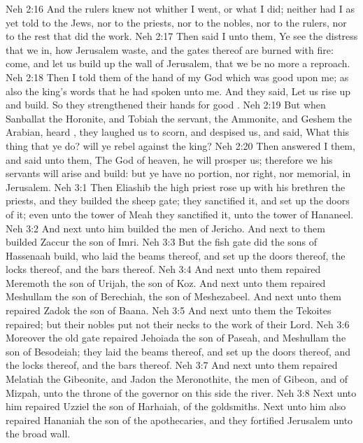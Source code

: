 \vs Neh 2:16 And the rulers knew not whither I went, or what I did; neither had I as yet told  to the Jews, nor to the priests, nor to the nobles, nor to the rulers, nor to the rest that did the work.
\vs Neh 2:17 Then said I unto them, Ye see the distress that we  in, how Jerusalem  waste, and the gates thereof are burned with fire: come, and let us build up the wall of Jerusalem, that we be no more a reproach.
\vs Neh 2:18 Then I told them of the hand of my God which was good upon me; as also the king's words that he had spoken unto me. And they said, Let us rise up and build. So they strengthened their hands for  good .
\vs Neh 2:19 But when Sanballat the Horonite, and Tobiah the servant, the Ammonite, and Geshem the Arabian, heard , they laughed us to scorn, and despised us, and said, What  this thing that ye do? will ye rebel against the king?
\vs Neh 2:20 Then answered I them, and said unto them, The God of heaven, he will prosper us; therefore we his servants will arise and build: but ye have no portion, nor right, nor memorial, in Jerusalem.
\vs Neh 3:1 Then Eliashib the high priest rose up with his brethren the priests, and they builded the sheep gate; they sanctified it, and set up the doors of it; even unto the tower of Meah they sanctified it, unto the tower of Hananeel.
\vs Neh 3:2 And next unto him builded the men of Jericho. And next to them builded Zaccur the son of Imri.
\vs Neh 3:3 But the fish gate did the sons of Hassenaah build, who  laid the beams thereof, and set up the doors thereof, the locks thereof, and the bars thereof.
\vs Neh 3:4 And next unto them repaired Meremoth the son of Urijah, the son of Koz. And next unto them repaired Meshullam the son of Berechiah, the son of Meshezabeel. And next unto them repaired Zadok the son of Baana.
\vs Neh 3:5 And next unto them the Tekoites repaired; but their nobles put not their necks to the work of their Lord.
\vs Neh 3:6 Moreover the old gate repaired Jehoiada the son of Paseah, and Meshullam the son of Besodeiah; they laid the beams thereof, and set up the doors thereof, and the locks thereof, and the bars thereof.
\vs Neh 3:7 And next unto them repaired Melatiah the Gibeonite, and Jadon the Meronothite, the men of Gibeon, and of Mizpah, unto the throne of the governor on this side the river.
\vs Neh 3:8 Next unto him repaired Uzziel the son of Harhaiah, of the goldsmiths. Next unto him also repaired Hananiah the son of  the apothecaries, and they fortified Jerusalem unto the broad wall.
